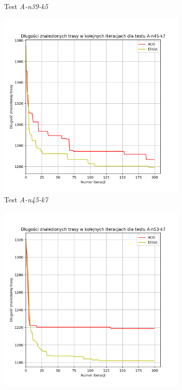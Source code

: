 \documentclass[10pt]{article}
\begin{document}
\begin{figure}[H]
\begin{subfigure}[b]{0.4\textwidth}
         \caption{Test \textit{A-n39-k5}}
     \end{subfigure}
     \hfill
     \begin{subfigure}[b]{0.4\textwidth}
         \centering
         \includegraphics[width=\textwidth]{iterations_elitist_3.png}
         \caption{Test \textit{A-n45-k7}}
     \end{subfigure}
     \hfill
     \begin{subfigure}[b]{0.4\textwidth}
         \centering
         \includegraphics[width=\textwidth]{iterations_elitist_4.png}

\end{subfigure}
\end{figure}
\end{document}
